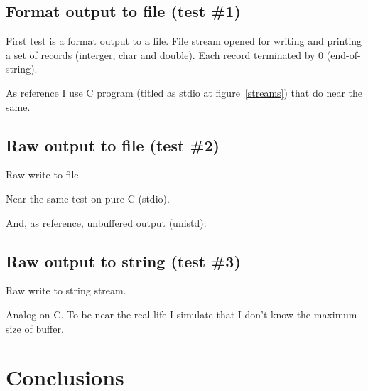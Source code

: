 \documentclass[a4paper]{article}
\begin{document}
\subsection{Format output to file\label{fstream-format} (test \#1)}

First test is a format output to a file. File stream opened for writing
and printing a set of records (interger, char and double). Each record
terminated by 0 (end-of-string).



As reference I use C program (titled as stdio at figure~\ref{streams}) that
do near the same.



\subsection{Raw output to file\label{fstream-raw} (test \#2)}

Raw write to file.



Near the same test on pure C (stdio).



And, as reference, unbuffered output (unistd):



\subsection{Raw output to string\label{sstream-raw} (test \#3)}

Raw write to string stream.



Analog on C. To be near the real life I simulate that I don't know
the maximum size of buffer.



\section{Conclusions}
\end{document}
